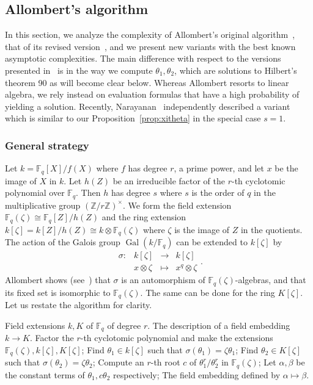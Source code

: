 \documentclass{mcom-l}
\theoremstyle{plain}
\theoremstyle{definition}
\DeclareMathOperator{\gal}{Gal} %
\newcommand{\Z}{\ensuremath{\mathbb{Z}}}
\newcommand{\F}{\ensuremath{\mathbb{F}}}
\newcounter{algorithm}
\begin{document}
\subsection{Allombert's algorithm}
\label{sec:fast-kummer}

In this section, we analyze the complexity of Allombert's original
algorithm~\cite{Allombert02}, that of its revised version~\cite{Allombert02-rev},
and we present new variants with the best known asymptotic complexities.
The main difference with respect to the 
versions presented in~\cite{Allombert02,Allombert02-rev} is in the way
we compute $\theta_1, \theta_2$, which are solutions to Hilbert's theorem 90
as will become clear below.
Whereas Allombert resorts to linear algebra, we rely instead on evaluation
formulas that have a high probability of yielding a solution.
Recently, Narayanan~\cite[Sec.~3]{narayanan2016fast} independently described 
a variant which is similar to our Proposition~\ref{prop:xitheta}
in the special case $s=1$.

\subsubsection{General strategy}
Let $k=\F_q[X]/f(X)$ where $f$ has degree $r$, a prime power, and let $x$ be the image of $X$ in $k$.
Let $h(Z)$ be an 
irreducible factor of the $r$-th cyclotomic polynomial over $\F_q$. Then $h$ has degree $s$ where 
$s$ is the order of $q$ in the multiplicative group $(\Z/r\Z)^\times$. We form the field extension
$\F_q(\zeta) \cong \F_q[Z] / h(Z)$ and the ring extension $k[\zeta] = k[Z] / h(Z) \cong k \otimes
\F_q(\zeta)$ where $\zeta$ is the image of $Z$ in the quotients. The action of the Galois group
$\gal(k / \F_q)$ can be extended to $k[\zeta]$ by
\[
\left.
\begin{array}{llll}
\sigma: & k[\zeta] & \rightarrow & k[\zeta] \\
& x \otimes \zeta & \mapsto & x^q \otimes \zeta
\end{array}
\right.
.
\]
Allombert shows (see~\cite[Prop.~3.2]{Allombert02}) that $\sigma$ is
an automorphism of $\F_q(\zeta)$-algebras, and that its fixed set is
isomorphic to $\F_q(\zeta)$.
The same can be done for the ring $K[\zeta]$.
Let us restate the algorithm for clarity.

\begin{algorithm}
	\begin{algorithmic}[1]
		\REQUIRE Field extensions $k, K$ of $\F_q$ of degree $r$.
		\ENSURE The description of a field embedding $k\to K$.
		\STATE Factor the $r$-th cyclotomic polynomial and make the extensions $\F_q(\zeta), 
		k[\zeta], K[\zeta]$;
		\STATE Find $\theta_1 \in k[\zeta]$ such that $\sigma(\theta_1) = \zeta\theta_1$;
		\STATE Find $\theta_2 \in K[\zeta]$ such that $\sigma(\theta_2) = \zeta\theta_2$;
		\STATE Compute an $r$-th root $c$ of $\theta_1^r / \theta_2^r$ in $\F_q(\zeta)$;
		\STATE Let $\alpha, \beta$ be the constant terms of $\theta_1, c\theta_2$ respectively;
		\RETURN The field embedding defined by $\alpha\mapsto\beta$.
	\end{algorithmic}
        \label{alog:allombert}
\end{algorithm}
\end{document}
